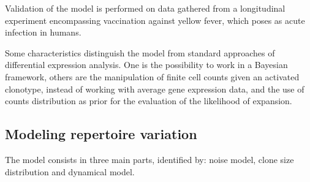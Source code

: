 \documentclass[a4paper,twocolumn]{article}
\begin{document}
Validation of the model is performed on data gathered from a longitudinal experiment encompassing vaccination against yellow fever, which poses as acute infection in humans.

Some characteristics distinguish the model from standard approaches of differential expression analysis. One is the possibility to work in a Bayesian framework, others are the manipulation of finite cell counts given an activated clonotype, instead of working with average gene expression data, and the use of counts distribution as prior for the evaluation of the likelihood of expansion.

\subsection{Modeling repertoire variation}
The model consists in three main parts, identified by: noise model, clone size distribution and dynamical model.
\end{document}
